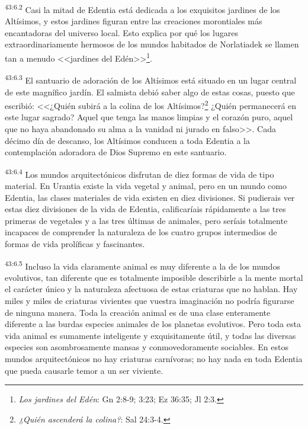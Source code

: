 \par
\textsuperscript{43:6.2} Casi la mitad de Edentia está dedicada a los exquisitos jardines de los Altísimos, y estos jardines figuran entre las creaciones morontiales más encantadoras del universo local. Esto explica por qué los lugares extraordinariamente hermosos de los mundos habitados de Norlatiadek se llamen tan a menudo <<jardines del Edén>>\footnote{\textit{Los jardines del Edén}: Gn 2:8-9; 3:23; Ez 36:35; Jl 2:3.}.

\par
\textsuperscript{43:6.3} El santuario de adoración de los Altísimos está situado en un lugar central de este magnífico jardín. El salmista debió saber algo de estas cosas, puesto que escribió: <<¿Quién subirá a la colina de los Altísimos?\footnote{\textit{¿Quién ascenderá la colina?}: Sal 24:3-4.} ¿Quién permanecerá en este lugar sagrado? Aquel que tenga las manos limpias y el corazón puro, aquel que no haya abandonado su alma a la vanidad ni jurado en falso>>. Cada décimo día de descanso, los Altísimos conducen a toda Edentia a la contemplación adoradora de Dios Supremo en este santuario.

\par
\textsuperscript{43:6.4} Los mundos arquitectónicos disfrutan de diez formas de vida de tipo material. En Urantia existe la vida vegetal y animal, pero en un mundo como Edentia, las clases materiales de vida existen en diez divisiones. Si pudierais ver estas diez divisiones de la vida de Edentia, calificaríais rápidamente a las tres primeras de vegetales y a las tres últimas de animales, pero seríais totalmente incapaces de comprender la naturaleza de los cuatro grupos intermedios de formas de vida prolíficas y fascinantes.

\par
\textsuperscript{43:6.5} Incluso la vida claramente animal es muy diferente a la de los mundos evolutivos, tan diferente que es totalmente imposible describirle a la mente mortal el carácter único y la naturaleza afectuosa de estas criaturas que no hablan. Hay miles y miles de criaturas vivientes que vuestra imaginación no podría figurarse de ninguna manera. Toda la creación animal es de una clase enteramente diferente a las burdas especies animales de los planetas evolutivos. Pero toda esta vida animal es sumamente inteligente y exquisitamente útil, y todas las diversas especies son asombrosamente mansas y conmovedoramente sociables. En estos mundos arquitectónicos no hay criaturas carnívoras; no hay nada en toda Edentia que pueda causarle temor a un ser viviente.

